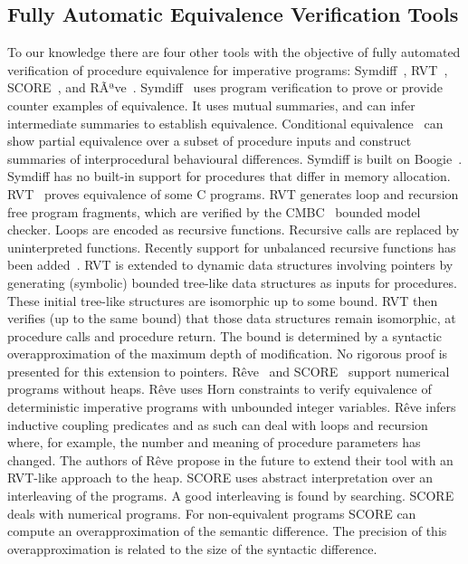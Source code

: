 \documentclass[runningheads,a4paper]{llncs}
\begin{document}
\subsection{Fully Automatic Equivalence Verification Tools}
To our knowledge there are four other tools with the objective of fully automated verification of procedure equivalence for imperative programs: Symdiff~\cite{Lahiri2012}, RVT~\cite{Godlin09}, SCORE~\cite{Partush2014}, and RÃªve~\cite{Felsing2014}.
Symdiff~\cite{Lahiri2012} uses program verification to prove or provide counter examples of equivalence. It uses mutual summaries, and can infer intermediate summaries to establish equivalence. Conditional equivalence~\cite{Hawblitzel2013} can show partial equivalence over a subset of procedure inputs and construct summaries of interprocedural behavioural differences. Symdiff is built on Boogie~\cite{Barnett2005}. Symdiff has no 
built-in support for procedures that differ in memory allocation.
RVT~\cite{Godlin09} proves equivalence of some C programs. RVT generates loop and recursion free program fragments, which are verified by the CMBC~\cite{Clarke2003} bounded model checker. Loops are encoded as recursive functions. Recursive calls are replaced by uninterpreted functions. Recently support for unbalanced recursive functions has been added~\cite{Strichman2016}. RVT is extended to dynamic data structures involving pointers by generating (symbolic) bounded tree-like data structures as inputs for procedures. These initial tree-like structures are isomorphic up to some bound. RVT then verifies (up to the same bound) that those data structures remain isomorphic, at procedure calls and procedure return. The bound is determined by a syntactic overapproximation of the maximum depth of modification. No rigorous proof is presented for this extension to pointers.
R{\^e}ve~\cite{Felsing2014} and SCORE~\cite{Partush2014} support numerical programs without heaps. R{\^e}ve uses Horn constraints to verify equivalence of deterministic imperative programs with unbounded integer variables. R{\^e}ve infers inductive coupling predicates and as such can deal with loops and recursion where, for example, the number and meaning of procedure parameters has changed. The authors of R{\^e}ve propose in the future to extend their tool with an RVT-like approach to the heap. SCORE uses abstract interpretation over an interleaving of the programs. A good interleaving is found by searching. SCORE deals with numerical programs. For non-equivalent programs SCORE can compute an overapproximation of the semantic difference. The precision of this overapproximation is related to the size of the syntactic difference.
\end{document}
